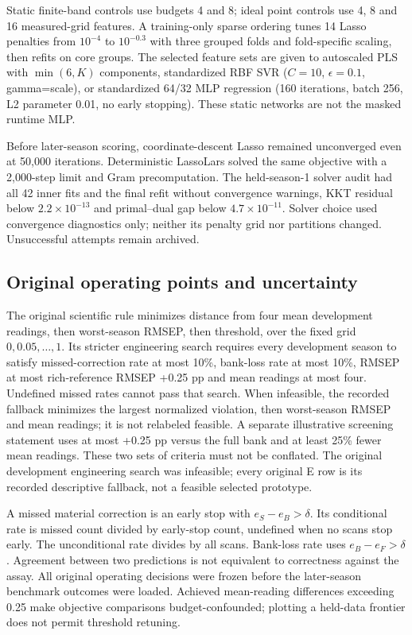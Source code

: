 \documentclass[10pt,a4paper]{article}
\begin{document}
Static finite-band controls use budgets 4 and 8; ideal point controls use 4, 8 and 16 measured-grid features. A training-only sparse ordering tunes 14 Lasso penalties from $10^{-4}$ to $10^{-0.3}$ with three grouped folds and fold-specific scaling, then refits on core groups. The selected feature sets are given to autoscaled PLS with $\min(6,K)$ components, standardized RBF SVR ($C=10$, $\epsilon=0.1$, gamma=scale), or standardized 64/32 MLP regression (160 iterations, batch 256, L2 parameter 0.01, no early stopping). These static networks are not the masked runtime MLP.

Before later-season scoring, coordinate-descent Lasso remained unconverged even at 50,000 iterations. Deterministic LassoLars solved the same objective with a 2,000-step limit and Gram precomputation. The held-season-1 solver audit had all 42 inner fits and the final refit without convergence warnings, KKT residual below $2.2\times10^{-13}$ and primal--dual gap below $4.7\times10^{-11}$. Solver choice used convergence diagnostics only; neither its penalty grid nor partitions changed. Unsuccessful attempts remain archived.

\subsection{Original operating points and uncertainty}
The original scientific rule minimizes distance from four mean development readings, then worst-season RMSEP, then threshold, over the fixed grid $0,0.05,\ldots,1$. Its stricter engineering search requires every development season to satisfy missed-correction rate at most 10\%, bank-loss rate at most 10\%, RMSEP at most rich-reference RMSEP +0.25 pp and mean readings at most four. Undefined missed rates cannot pass that search. When infeasible, the recorded fallback minimizes the largest normalized violation, then worst-season RMSEP and mean readings; it is not relabeled feasible. A separate illustrative screening statement uses at most +0.25 pp versus the full bank and at least 25\% fewer mean readings. These two sets of criteria must not be conflated. The original development engineering search was infeasible; every original E row is its recorded descriptive fallback, not a feasible selected prototype.

A missed material correction is an early stop with $e_S-e_B>\delta$. Its conditional rate is missed count divided by early-stop count, undefined when no scans stop early. The unconditional rate divides by all scans. Bank-loss rate uses $e_B-e_F>\delta$. Agreement between two predictions is not equivalent to correctness against the assay. All original operating decisions were frozen before the later-season benchmark outcomes were loaded. Achieved mean-reading differences exceeding 0.25 make objective comparisons budget-confounded; plotting a held-data frontier does not permit threshold retuning.
\end{document}
